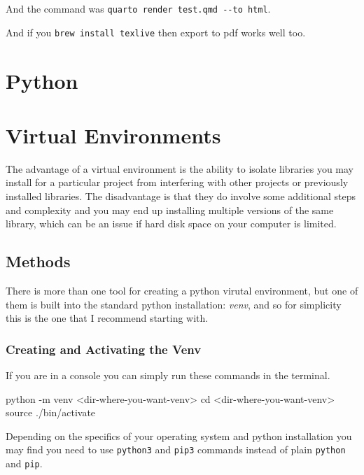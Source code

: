 \documentclass[
  letterpaper,
  DIV=11,
  numbers=noendperiod]{scrreprt}
\newenvironment{Shaded}{\begin{snugshade}}{\end{snugshade}}
\newcommand{\NormalTok}[1]{\textcolor[rgb]{0.00,0.23,0.31}{#1}}
\begin{document}
And the command was \texttt{quarto\ render\ test.qmd\ -\/-to\ html}.

And if you \texttt{brew\ install\ texlive} then export to pdf works well
too.

\chapter{Python}\label{python-1}

\chapter{Virtual Environments}\label{virtual-environments}

The advantage of a virtual environment is the ability to isolate
libraries you may install for a particular project from interfering with
other projects or previously installed libraries. The disadvantage is
that they do involve some additional steps and complexity and you may
end up installing multiple versions of the same library, which can be an
issue if hard disk space on your computer is limited.

\section{Methods}\label{methods}

There is more than one tool for creating a python virutal environment,
but one of them is built into the standard python installation:
\emph{venv}, and so for simplicity this is the one that I recommend
starting with.

\subsection{Creating and Activating the
Venv}\label{creating-and-activating-the-venv}

If you are in a console you can simply run these commands in the
terminal.

\begin{Shaded}
\begin{Highlighting}[]
\NormalTok{python {-}m venv \textless{}dir{-}where{-}you{-}want{-}venv\textgreater{}}
\NormalTok{cd \textless{}dir{-}where{-}you{-}want{-}venv\textgreater{}}
\NormalTok{source ./bin/activate}
\end{Highlighting}
\end{Shaded}

\begin{tcolorbox}[enhanced jigsaw, opacityback=0, leftrule=.75mm, colback=white, left=2mm, titlerule=0mm, toprule=.15mm, toptitle=1mm, coltitle=black, title=\textcolor{quarto-callout-note-color}{\faInfo}\hspace{0.5em}{Note}, opacitybacktitle=0.6, colbacktitle=quarto-callout-note-color!10!white, breakable, bottomrule=.15mm, bottomtitle=1mm, colframe=quarto-callout-note-color-frame, arc=.35mm, rightrule=.15mm]

Depending on the specifics of your operating system and python
installation you may find you need to use \texttt{python3} and
\texttt{pip3} commands instead of plain \texttt{python} and
\texttt{pip}.

\end{tcolorbox}
\end{document}
